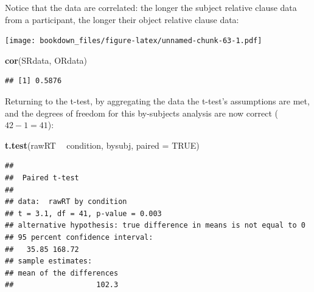 \documentclass[12pt,]{krantz}
\newenvironment{Shaded}{\begin{snugshade}}{\end{snugshade}}
\newcommand{\DataTypeTok}[1]{\textcolor[rgb]{0.13,0.29,0.53}{#1}}
\newcommand{\KeywordTok}[1]{\textcolor[rgb]{0.13,0.29,0.53}{\textbf{#1}}}
\newcommand{\NormalTok}[1]{#1}
\newcommand{\OperatorTok}[1]{\textcolor[rgb]{0.81,0.36,0.00}{\textbf{#1}}}
\newcommand{\OtherTok}[1]{\textcolor[rgb]{0.56,0.35,0.01}{#1}}
\newcommand{\StringTok}[1]{\textcolor[rgb]{0.31,0.60,0.02}{#1}}
\begin{document}
Notice that the data are correlated: the longer the subject relative clause data from a participant, the longer their object relative clause data:

\begin{Shaded}
\end{Shaded}

\texttt{[image: bookdown\_files/figure-latex/unnamed-chunk-63-1.pdf]}

\begin{Shaded}
\begin{Highlighting}[]
\KeywordTok{cor}\NormalTok{(SRdata, ORdata)}
\end{Highlighting}
\end{Shaded}

\begin{verbatim}
## [1] 0.5876
\end{verbatim}

Returning to the t-test, by aggregating the data the t-test's assumptions are met, and the degrees of freedom for this by-subjects analysis are now correct (\(42-1=41\)):

\begin{Shaded}
\begin{Highlighting}[]
\KeywordTok{t.test}\NormalTok{(rawRT }\OperatorTok{~}\StringTok{ }\NormalTok{condition, bysubj, }\DataTypeTok{paired =} \OtherTok{TRUE}\NormalTok{)}
\end{Highlighting}
\end{Shaded}

\begin{verbatim}
## 
## 	Paired t-test
## 
## data:  rawRT by condition
## t = 3.1, df = 41, p-value = 0.003
## alternative hypothesis: true difference in means is not equal to 0
## 95 percent confidence interval:
##   35.85 168.72
## sample estimates:
## mean of the differences 
##                   102.3
\end{verbatim}
\end{document}
